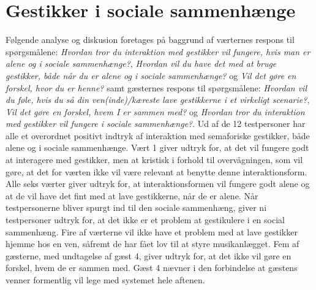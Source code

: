 \section{Gestikker i sociale sammenhænge}
\label{TestresultaterSocialAcceptSocial}
%
Følgende analyse og diskusion foretages på baggrund af værternes respons til spørgsmålene: \textit{Hvordan tror du interaktion med gestikker vil fungere, hvis man er alene og i sociale sammenhænge?}, \textit{Hvordan vil du have det med at bruge gestikker, både når du er alene og i sociale sammenhænge?} og \textit{Vil det gøre en forskel, hvor du er henne?} samt gæsternes respons til spørgsmålene: \textit{Hvordan vil du føle, hvis du så din ven(inde)/kæreste lave gestikkerne i et virkeligt scenarie?}, \textit{Vil det gøre en forskel, hvem I er sammen med?} og \textit{Hvordan tror du interaktion med gestikker vil fungere i sociale sammenhænge?}. \blankline
%
Ud af de 12 testpersoner har alle et overordnet positivt indtryk af interaktion med semaforiske gestikker, både alene og i sociale sammenhænge. Vært 1 giver udtryk for, at det vil fungere godt at interagere med gestikker, men at kristisk i forhold til overvågningen, som vil gøre, at det for værten ikke vil være relevant at benytte denne interaktionsform. Alle seks værter giver udtryk for, at interaktionsformen vil fungere godt alene og at de vil have det fint med at lave gestikkerne, når de er alene. Når testpersonerne bliver spurgt ind til den sociale sammenhæng, giver ni testpersoner udtryk for, at det ikke er et problem at gestikulere i en social sammenhæng. Fire af værterne vil ikke have et problem med at lave gestikker hjemme hos en ven, såfremt de har fået lov til at styre musikanlægget. Fem af gæsterne, med undtagelse af gæst 4, giver udtryk for, at det ikke vil gøre en forskel, hvem de er sammen med. Gæst 4 nævner i den forbindelse at gæstens venner formentlig vil lege med systemet hele aftenen. 

